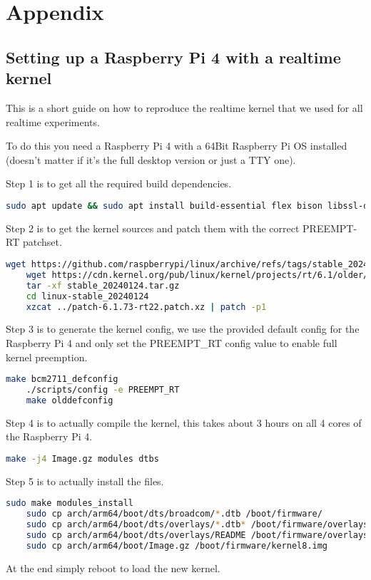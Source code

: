 \chapter{Appendix}
\label{chap:appendix}

\section{Setting up a Raspberry Pi 4 with a realtime kernel}
\label{sec:appendix:realtime}
This is a short guide on how to reproduce the realtime kernel that we used for all realtime experiments.

To do this you need a Raspberry Pi 4 with a 64Bit Raspberry Pi OS installed (doesn't matter if it's the full desktop version or just a TTY one).

Step 1 is to get all the required build dependencies.
\begin{lstlisting}[language=bash, breaklines]
    sudo apt update && sudo apt install build-essential flex bison libssl-dev bc
\end{lstlisting}

Step 2 is to get the kernel sources and patch them with the correct PREEMPT-RT patchset.
\begin{lstlisting}[language=bash, breaklines]
    wget https://github.com/raspberrypi/linux/archive/refs/tags/stable_20240124.tar.gz
    wget https://cdn.kernel.org/pub/linux/kernel/projects/rt/6.1/older/patch-6.1.73-rt22.patch.xz
    tar -xf stable_20240124.tar.gz
    cd linux-stable_20240124
    xzcat ../patch-6.1.73-rt22.patch.xz | patch -p1
\end{lstlisting}

Step 3 is to generate the kernel config, we use the provided default config for the Raspberry Pi 4 and only set the PREEMPT\_RT config value to enable full kernel preemption.
\begin{lstlisting}[language=bash, breaklines]
    make bcm2711_defconfig
    ./scripts/config -e PREEMPT_RT
    make olddefconfig
\end{lstlisting}

Step 4 is to actually compile the kernel, this takes about 3 hours on all 4 cores of the Raspberry Pi 4.
\begin{lstlisting}[language=bash, breaklines]
    make -j4 Image.gz modules dtbs
\end{lstlisting}

Step 5 is to actually install the files.
\begin{lstlisting}[language=bash, breaklines]
    sudo make modules_install
    sudo cp arch/arm64/boot/dts/broadcom/*.dtb /boot/firmware/
    sudo cp arch/arm64/boot/dts/overlays/*.dtb* /boot/firmware/overlays/
    sudo cp arch/arm64/boot/dts/overlays/README /boot/firmware/overlays/
    sudo cp arch/arm64/boot/Image.gz /boot/firmware/kernel8.img
\end{lstlisting}

At the end simply reboot to load the new kernel.
